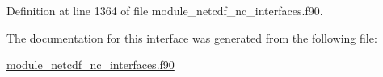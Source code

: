Definition at line 1364 of file module\+\_\+netcdf\+\_\+nc\+\_\+interfaces.\+f90.



The documentation for this interface was generated from the following file\+:\begin{DoxyCompactItemize}
\item 
\hyperlink{module__netcdf__nc__interfaces_8f90}{module\+\_\+netcdf\+\_\+nc\+\_\+interfaces.\+f90}\end{DoxyCompactItemize}
